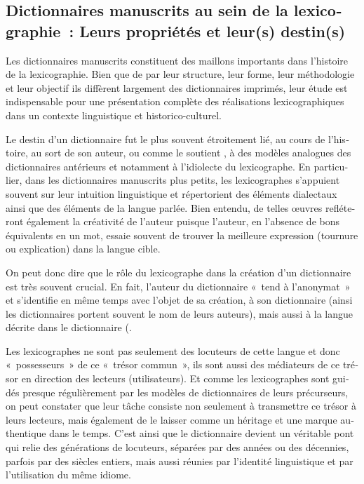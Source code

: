 \documentclass[output=paper,colorlinks,citecolor=brown,arabicfont,chinesefont,booklanguage=french]{langscibook}
\begin{document}
\begin{otherlanguage}{french}
\section{Dictionnaires manuscrits au sein de la lexicographie~: Leurs propriétés et leur(s) destin(s) }

Les dictionnaires manuscrits constituent des maillons importants dans l’histoire de la lexicographie. Bien que de par leur structure, leur forme, leur méthodologie et leur objectif ils diffèrent largement des dictionnaires imprimés, leur étude est indispensable pour une présentation complète des réalisations lexicographiques dans un contexte linguistique et historico-culturel.

Le destin d’un dictionnaire fut le plus souvent étroitement lié, au cours de l’histoire, au sort de son auteur, ou comme le soutient \citet[118]{Rey2008}, à des modèles analogues des dictionnaires antérieurs et notamment à l’idiolecte du lexicographe. En particulier, dans les dictionnaires manuscrits plus petits, les lexicographes s’appuient souvent sur leur intuition linguistique et répertorient des éléments dialectaux ainsi que des éléments de la langue parlée. Bien entendu, de telles œuvres refléteront également la créativité de l’auteur puisque l’auteur, en l’absence de bons équivalents en un mot, essaie souvent de trouver la meilleure expression (tournure ou explication) dans la langue cible.

On peut donc dire que le rôle du lexicographe dans la création d’un dictionnaire est très souvent crucial. En fait, l’auteur du dictionnaire «~tend à l’anonymat~» et s’identifie en même temps avec l’objet de sa création, à son dictionnaire (ainsi les dictionnaires portent souvent le nom de leurs auteurs), mais aussi à la langue décrite dans le dictionnaire (\citet[41]{Dubois1970}.

Les lexicographes ne sont pas seulement des locuteurs de cette langue et donc «~possesseurs~» de ce «~trésor commun~», ils sont aussi des médiateurs de ce trésor en direction des lecteurs (utilisateurs). Et comme les lexicographes sont guidés presque régulièrement par les modèles de dictionnaires de leurs précurseurs, on peut constater que leur tâche consiste non seulement à transmettre ce trésor à leurs lecteurs, mais également de le laisser comme un héritage et une marque authentique dans le temps. C’est ainsi que le dictionnaire devient un véritable pont qui relie des générations de locuteurs, séparées par des années ou des décennies, parfois par des siècles entiers, mais aussi réunies par l’identité linguistique et par l’utilisation du même idiome.  


\end{otherlanguage}
\end{document}
